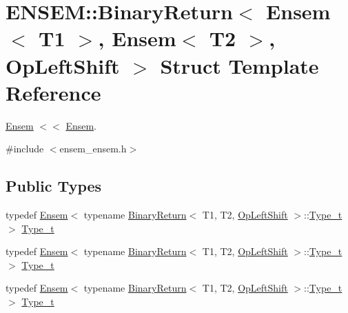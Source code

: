 \hypertarget{structENSEM_1_1BinaryReturn_3_01Ensem_3_01T1_01_4_00_01Ensem_3_01T2_01_4_00_01OpLeftShift_01_4}{}\section{E\+N\+S\+EM\+:\+:Binary\+Return$<$ Ensem$<$ T1 $>$, Ensem$<$ T2 $>$, Op\+Left\+Shift $>$ Struct Template Reference}
\label{structENSEM_1_1BinaryReturn_3_01Ensem_3_01T1_01_4_00_01Ensem_3_01T2_01_4_00_01OpLeftShift_01_4}


\mbox{\hyperlink{classENSEM_1_1Ensem}{Ensem}} $<$$<$ \mbox{\hyperlink{classENSEM_1_1Ensem}{Ensem}}.  




{\ttfamily \#include $<$ensem\+\_\+ensem.\+h$>$}

\subsection*{Public Types}
\begin{DoxyCompactItemize}
\item 
typedef \mbox{\hyperlink{classENSEM_1_1Ensem}{Ensem}}$<$ typename \mbox{\hyperlink{structENSEM_1_1BinaryReturn}{Binary\+Return}}$<$ T1, T2, \mbox{\hyperlink{structENSEM_1_1OpLeftShift}{Op\+Left\+Shift}} $>$\+::\mbox{\hyperlink{structENSEM_1_1BinaryReturn_3_01Ensem_3_01T1_01_4_00_01Ensem_3_01T2_01_4_00_01OpLeftShift_01_4_aed9853484e9cd6dbd5752114f8422cd1}{Type\+\_\+t}} $>$ \mbox{\hyperlink{structENSEM_1_1BinaryReturn_3_01Ensem_3_01T1_01_4_00_01Ensem_3_01T2_01_4_00_01OpLeftShift_01_4_aed9853484e9cd6dbd5752114f8422cd1}{Type\+\_\+t}}
\item 
typedef \mbox{\hyperlink{classENSEM_1_1Ensem}{Ensem}}$<$ typename \mbox{\hyperlink{structENSEM_1_1BinaryReturn}{Binary\+Return}}$<$ T1, T2, \mbox{\hyperlink{structENSEM_1_1OpLeftShift}{Op\+Left\+Shift}} $>$\+::\mbox{\hyperlink{structENSEM_1_1BinaryReturn_3_01Ensem_3_01T1_01_4_00_01Ensem_3_01T2_01_4_00_01OpLeftShift_01_4_aed9853484e9cd6dbd5752114f8422cd1}{Type\+\_\+t}} $>$ \mbox{\hyperlink{structENSEM_1_1BinaryReturn_3_01Ensem_3_01T1_01_4_00_01Ensem_3_01T2_01_4_00_01OpLeftShift_01_4_aed9853484e9cd6dbd5752114f8422cd1}{Type\+\_\+t}}
\item 
typedef \mbox{\hyperlink{classENSEM_1_1Ensem}{Ensem}}$<$ typename \mbox{\hyperlink{structENSEM_1_1BinaryReturn}{Binary\+Return}}$<$ T1, T2, \mbox{\hyperlink{structENSEM_1_1OpLeftShift}{Op\+Left\+Shift}} $>$\+::\mbox{\hyperlink{structENSEM_1_1BinaryReturn_3_01Ensem_3_01T1_01_4_00_01Ensem_3_01T2_01_4_00_01OpLeftShift_01_4_aed9853484e9cd6dbd5752114f8422cd1}{Type\+\_\+t}} $>$ \mbox{\hyperlink{structENSEM_1_1BinaryReturn_3_01Ensem_3_01T1_01_4_00_01Ensem_3_01T2_01_4_00_01OpLeftShift_01_4_aed9853484e9cd6dbd5752114f8422cd1}{Type\+\_\+t}}
\end{DoxyCompactItemize}


